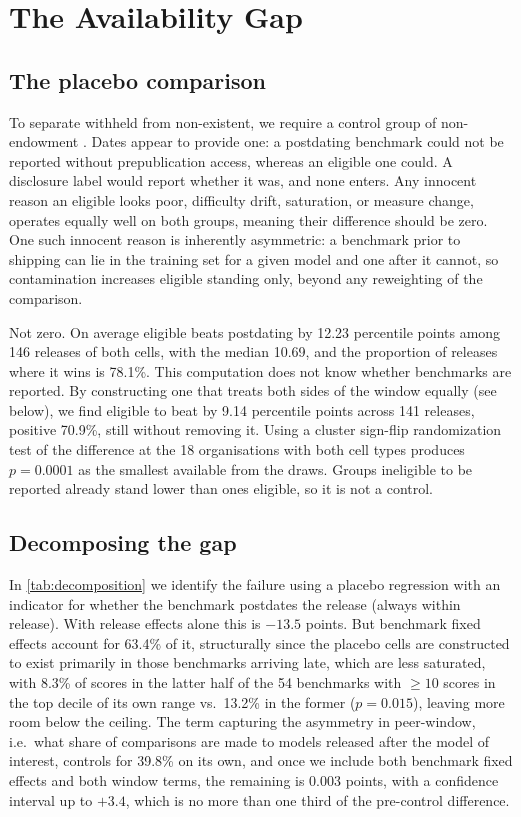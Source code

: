 \section{The Availability Gap}\label{sec:core}

\subsection{The placebo comparison}\label{sec:core-placebo}

To separate withheld from non-existent, we require a control group of non-endowment \citep{dye1985}. Dates appear to provide one: a postdating benchmark could not be reported without prepublication access, whereas an eligible one could. A disclosure label would report whether it was, and none enters. Any innocent reason an eligible looks poor, difficulty drift, saturation, or measure change, operates equally well on both groups, meaning their difference should be zero. One such innocent reason is inherently asymmetric: a benchmark prior to shipping can lie in the training set for a given model and one after it cannot, so contamination increases eligible standing only, beyond any reweighting of the comparison.

Not zero. On average eligible beats postdating by 12.23 percentile points among 146 releases of both cells, with the median 10.69, and the proportion of releases where it wins is 78.1\%. This computation does not know whether benchmarks are reported. By constructing one that treats both sides of the window equally (see below), we find eligible to beat by 9.14 percentile points across 141 releases, positive 70.9\%, still without removing it. Using a cluster sign-flip randomization test of the difference at the 18 organisations with both cell types produces $p = 0.0001$ as the smallest available from the draws. Groups ineligible to be reported already stand lower than ones eligible, so it is not a control.

\subsection{Decomposing the gap}\label{sec:core-boundary}

In \autoref{tab:decomposition} we identify the failure using a placebo regression with an indicator for whether the benchmark postdates the release (always within release). With release effects alone this is $-13.5$ points. But benchmark fixed effects account for 63.4\% of it, structurally since the placebo cells are constructed to exist primarily in those benchmarks arriving late, which are less saturated, with 8.3\% of scores in the latter half of the 54 benchmarks with $\geq 10$ scores in the top decile of its own range vs.\ 13.2\% in the former ($p = 0.015$), leaving more room below the ceiling. The term capturing the asymmetry in peer-window, i.e.\ what share of comparisons are made to models released after the model of interest, controls for 39.8\% on its own, and once we include both benchmark fixed effects and both window terms, the remaining is 0.003 points, with a confidence interval up to $+3.4$, which is no more than one third of the pre-control difference.

